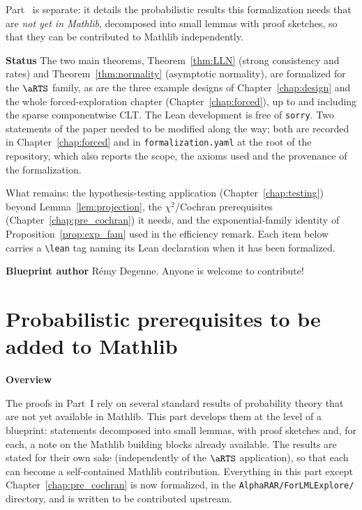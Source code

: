 Part~\ref{part:prereq} is separate: it details the probabilistic results this
formalization needs that are \emph{not yet in Mathlib}, decomposed into small
lemmas with proof sketches, so that they can be contributed to Mathlib
independently.

\textbf{Status} The two main theorems, Theorem~\ref{thm:LLN} (strong consistency and rates) and
Theorem~\ref{thm:normality} (asymptotic normality), are formalized for the $\aRTS$ family, as are
the three example designs of Chapter~\ref{chap:design} and the whole forced-exploration chapter
(Chapter~\ref{chap:forced}), up to and including the sparse componentwise CLT. The Lean development
is free of \texttt{sorry}. Two statements of the paper needed to be modified along the way; both are
recorded in Chapter~\ref{chap:forced} and in \texttt{formalization.yaml} at the root of the
repository, which also reports the scope, the axioms used and the provenance of the formalization.

What remains: the hypothesis-testing application (Chapter~\ref{chap:testing}) beyond
Lemma~\ref{lem:projection}, the $\chi^2$/Cochran prerequisites (Chapter~\ref{chap:pre_cochran}) it
needs, and the exponential-family identity of Proposition~\ref{prop:exp_fam} used in the efficiency
remark. Each item below carries a \texttt{\textbackslash lean} tag naming its Lean declaration when
it has been formalized.

\textbf{Blueprint author} Rémy Degenne. Anyone is welcome to contribute!











\part{Probabilistic prerequisites to be added to Mathlib}
\label{part:prereq}

\textbf{Overview}

The proofs in Part~I rely on several standard results of probability theory that
are not yet available in Mathlib. This part develops them at the level of a
blueprint: statements decomposed into small lemmas, with proof sketches and, for
each, a note on the Mathlib building blocks already available. The results are
stated for their own sake (independently of the $\aRTS$ application), so that
each can become a self-contained Mathlib contribution. Everything in this part
except Chapter~\ref{chap:pre_cochran} is now formalized, in the
\texttt{AlphaRAR/ForLMLExplore/} directory, and is written to be contributed upstream.

